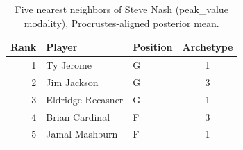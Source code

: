 \begin{table}[htbp]
  \centering\small
  \begin{tabular}{rllc}
    \toprule
    Rank & Player & Position & Archetype \\
    \midrule
    1 & Ty Jerome & G & 1 \\
    2 & Jim Jackson & G & 3 \\
    3 & Eldridge Recasner & G & 1 \\
    4 & Brian Cardinal & F & 3 \\
    5 & Jamal Mashburn & F & 1 \\
    \bottomrule
  \end{tabular}
  \caption{Five nearest neighbors of Steve Nash (peak_value modality), Procrustes-aligned posterior mean.}
  \label{tab:Steve_Nash_neighbors_peak_value}
\end{table}


